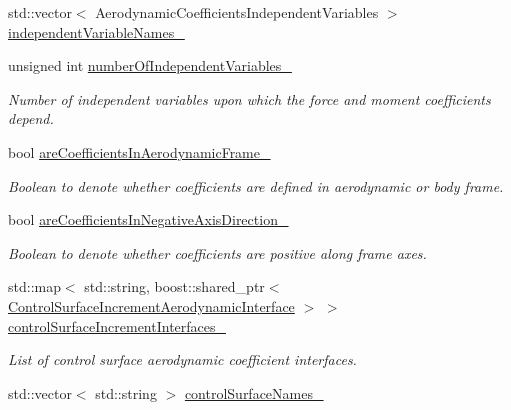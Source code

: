 \begin{DoxyCompactItemize}
std\+::vector$<$ Aerodynamic\+Coefficients\+Independent\+Variables $>$ \hyperlink{classtudat_1_1aerodynamics_1_1AerodynamicCoefficientInterface_a5e0570c4a1562fa17fde2fa5c5e2b3a8}{independent\+Variable\+Names\+\_\+}
\item 
unsigned int \hyperlink{classtudat_1_1aerodynamics_1_1AerodynamicCoefficientInterface_ab8d9151ab40af2f5bce2cf0208020e1b}{number\+Of\+Independent\+Variables\+\_\+}
\begin{DoxyCompactList}\small\item\em Number of independent variables upon which the force and moment coefficients depend. \end{DoxyCompactList}\item 
bool \hyperlink{classtudat_1_1aerodynamics_1_1AerodynamicCoefficientInterface_a29e32be7cec1045dba10c7a60182ad05}{are\+Coefficients\+In\+Aerodynamic\+Frame\+\_\+}
\begin{DoxyCompactList}\small\item\em Boolean to denote whether coefficients are defined in aerodynamic or body frame. \end{DoxyCompactList}\item 
bool \hyperlink{classtudat_1_1aerodynamics_1_1AerodynamicCoefficientInterface_a6ede4ceff6ef3a4eb91e4061750e5c19}{are\+Coefficients\+In\+Negative\+Axis\+Direction\+\_\+}
\begin{DoxyCompactList}\small\item\em Boolean to denote whether coefficients are positive along frame axes. \end{DoxyCompactList}\item 
std\+::map$<$ std\+::string, boost\+::shared\+\_\+ptr$<$ \hyperlink{classtudat_1_1aerodynamics_1_1ControlSurfaceIncrementAerodynamicInterface}{Control\+Surface\+Increment\+Aerodynamic\+Interface} $>$ $>$ \hyperlink{classtudat_1_1aerodynamics_1_1AerodynamicCoefficientInterface_a7f34228355d2b59ab660d79415df79ef}{control\+Surface\+Increment\+Interfaces\+\_\+}\hypertarget{classtudat_1_1aerodynamics_1_1AerodynamicCoefficientInterface_a7f34228355d2b59ab660d79415df79ef}{}\label{classtudat_1_1aerodynamics_1_1AerodynamicCoefficientInterface_a7f34228355d2b59ab660d79415df79ef}

\begin{DoxyCompactList}\small\item\em List of control surface aerodynamic coefficient interfaces. \end{DoxyCompactList}\item 
std\+::vector$<$ std\+::string $>$ \hyperlink{classtudat_1_1aerodynamics_1_1AerodynamicCoefficientInterface_ab14a77a9c578c1153ec128fc927fc4f9}{control\+Surface\+Names\+\_\+}\hypertarget{classtudat_1_1aerodynamics_1_1AerodynamicCoefficientInterface_ab14a77a9c578c1153ec128fc927fc4f9}{}\label{classtudat_1_1aerodynamics_1_1AerodynamicCoefficientInterface_ab14a77a9c578c1153ec128fc927fc4f9}


\end{DoxyCompactItemize}
